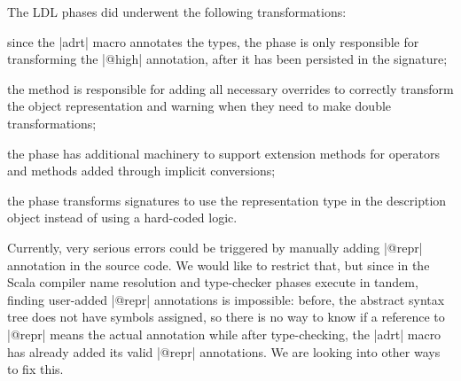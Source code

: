 The LDL phases did underwent the following transformations:
\begin{compactitem}
\item since the |adrt| macro annotates the types, the \inject{} phase is only responsible for transforming the |@high| annotation, after it has been persisted in the signature;
\item the \bridge{} method is responsible for adding all necessary overrides to correctly transform the object representation and warning when they need to make double transformations;
\item the \coerce{} phase has additional machinery to support extension methods for operators and methods added through implicit conversions;
\item the \commit{} phase transforms signatures to use the representation type in the description object instead of using a hard-coded logic.
\end{compactitem}

Currently, very serious errors could be triggered by manually adding |@repr| annotation in the source code. We would like to restrict that, but since in the Scala compiler name resolution and type-checker phases execute in tandem, finding user-added |@repr| annotations is impossible: before, the abstract syntax tree does not have symbols assigned, so there is no way to know if a reference to |@repr| means the actual annotation while after type-checking, the |adrt| macro has already added its valid |@repr| annotations. We are looking into other ways to fix this.
